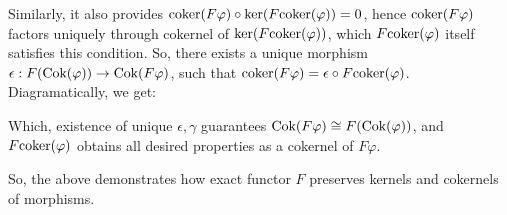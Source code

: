 \documentclass{article}
\newcommand{\coker}{\textmd{coker}}
\newcommand{\Ker}{\textmd{Ker}}
\newcommand{\Cok}{\textmd{Cok}}
\begin{document}
\begin{itemize}
    Similarly, it also provides $\coker(F\varphi)\circ \ker(F\coker(\varphi))=0$, hence $\coker(F\varphi)$ factors uniquely through cokernel of $\ker(F\coker(\varphi))$, which $F\coker(\varphi)$ itself satisfies this condition. So, there exists a unique morphism $\epsilon:F(\Cok(\varphi))\rightarrow \Cok(F\varphi)$, such that $\coker(F\varphi)=\epsilon\circ F\coker(\varphi)$. Diagramatically, we get:
    \begin{center}
    \end{center}
    Which, existence of unique $\epsilon,\gamma$ guarantees $\Cok(F\varphi)\cong F(\Cok(\varphi))$, and $F\coker(\varphi)$ obtains all desired properties as a cokernel of $F\varphi$.
\end{itemize}
So, the above demonstrates how exact functor $F$ preserves kernels and cokernels of morphisms.

\hfil

\hfil
\end{document}
